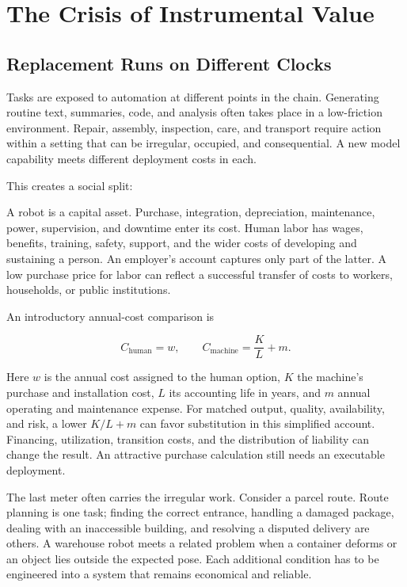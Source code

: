 \section{The Crisis of Instrumental Value}

\subsection{Replacement Runs on Different Clocks}

Tasks are exposed to automation at different points in the chain. Generating routine text, summaries, code, and analysis often takes place in a low-friction environment. Repair, assembly, inspection, care, and transport require action within a setting that can be irregular, occupied, and consequential. A new model capability meets different deployment costs in each.

This creates a social split: 


A robot is a capital asset. Purchase, integration, depreciation, maintenance, power, supervision, and downtime enter its cost. Human labor has wages, benefits, training, safety, support, and the wider costs of developing and sustaining a person. An employer's account captures only part of the latter. A low purchase price for labor can reflect a successful transfer of costs to workers, households, or public institutions.

An introductory annual-cost comparison is

\begin{equation}
C_{\mathrm{human}}=w,
\qquad
C_{\mathrm{machine}}=\frac{K}{L}+m.
\end{equation}

Here $w$ is the annual cost assigned to the human option, $K$ the machine's purchase and installation cost, $L$ its accounting life in years, and $m$ annual operating and maintenance expense. For matched output, quality, availability, and risk, a lower $K/L+m$ can favor substitution in this simplified account. Financing, utilization, transition costs, and the distribution of liability can change the result. An attractive purchase calculation still needs an executable deployment.

The last meter often carries the irregular work. Consider a parcel route. Route planning is one task; finding the correct entrance, handling a damaged package, dealing with an inaccessible building, and resolving a disputed delivery are others. A warehouse robot meets a related problem when a container deforms or an object lies outside the expected pose. Each additional condition has to be engineered into a system that remains economical and reliable.


